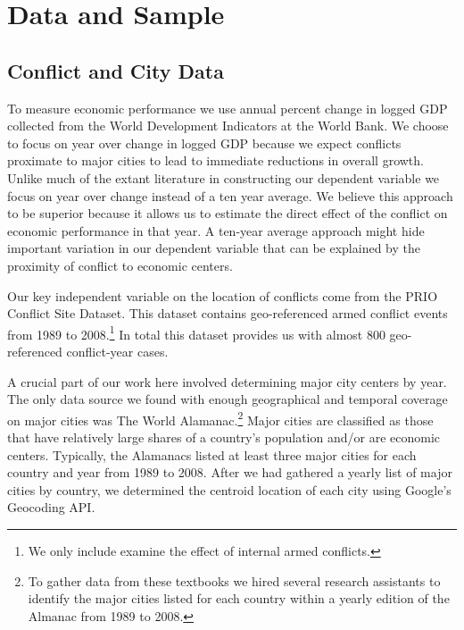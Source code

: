 \section{Data and Sample}
\label{empirics}

\subsection{Conflict and City Data}

To measure economic performance we use annual percent change in logged GDP collected from the World Development Indicators at the World Bank. We choose to focus on year over change in logged GDP because we expect conflicts proximate to major cities to lead to immediate reductions in overall growth. Unlike much of the extant literature in constructing our dependent variable we focus on year over change instead of a ten year average. We believe this approach to be superior because it allows us to estimate the direct effect of the conflict on economic performance in that year. A ten-year average approach might hide important variation in our dependent variable that can be explained by the proximity of conflict to economic centers.

Our key independent variable on the location of conflicts come from the PRIO Conflict Site Dataset. This dataset contains geo-referenced armed conflict events from 1989 to 2008.\footnote{We only include examine the effect of internal armed conflicts.} In total this dataset provides us with almost 800 geo-referenced conflict-year cases. 


A crucial part of our work here involved determining major city centers by year. The only data source we found with enough geographical and temporal coverage on major cities was The World Alamanac.\footnote{To gather data from these textbooks we hired several research assistants to identify the major cities listed for each country within a yearly edition of the Almanac from 1989 to 2008.} Major cities are classified as those that have relatively large shares of a country's population and/or are economic centers. Typically, the Alamanacs listed at least three major cities for each country and year from 1989 to 2008. After we had gathered a yearly list of major cities by country, we determined the centroid location of each city using Google's Geocoding API. 

